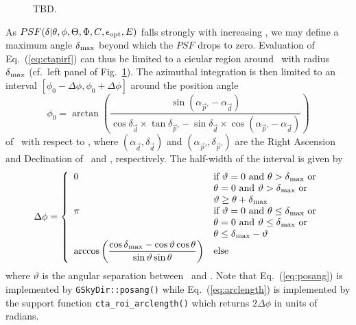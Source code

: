 \documentclass{article}[12pt,a4]
\begin{document}
\begin{figure}
\center
{}
\caption{TBD.
}
 \label{fig:ctapsfregion}
\end{figure}

As $PSF(\mbox{$\delta$} | \mbox{$\theta$}, \mbox{$\phi$}, \mbox{$\Theta$}, \mbox{$\Phi$}, \mbox{$C$}, \mbox{$\epsilon_{\rm opt}$}, E)$ falls strongly with increasing
\psfsep, we may define a maximum angle $\mbox{$\delta$}_{\rm max}$ beyond
which the $PSF$ drops to zero.
Evaluation of Eq.~(\ref{eq:ctapirf}) can thus be limited to a cicular region around
\phdir\ with radius $\mbox{$\delta$}_{\rm max}$ (cf.~left panel of Fig.~\ref{fig:ctapsfregion}).
The azimuthal integration is then limited to an interval 
$[\phi_0 - \Delta \phi, \phi_0 + \Delta \phi]$ around the position angle
\begin{equation}
\phi_0 = \arctan \left( 
\frac{\sin( \alpha_{\vec{p}'} - \alpha_{\vec{d}} )}
        {\cos \delta_{\vec{d}} \times \tan \delta_{\vec{p}'} - 
         \sin \delta_{\vec{d}} \times \cos( \alpha_{\vec{p}'} - \alpha_{\vec{d}} )}
\right)
\label{eq:posang}
\end{equation}
of \phdir\ with respect to \teldir, where
$(\alpha_{\vec{d}}, \delta_{\vec{d}})$ and
$(\alpha_{\vec{p}'}, \delta_{\vec{p}'})$ are the Right Ascension and Declination of
\teldir\ and \phdir, respectively.
The half-width of the interval is given by
\begin{equation}
\Delta \phi = \left \{
\begin{array}{l l}
\displaystyle
0 & \mbox{if $\vartheta = 0$ and $\mbox{$\theta$} > \mbox{$\delta$}_{\rm max}$ or} \\
& \mbox{$\mbox{$\theta$} = 0$ and $\vartheta > \mbox{$\delta$}_{\rm max}$ or} \\
& \mbox{$\vartheta \ge \mbox{$\theta$} + \mbox{$\delta$}_{\rm max}$} \\
\pi & \mbox{if $\vartheta = 0$ and $\mbox{$\theta$} \le \mbox{$\delta$}_{\rm max}$ or} \\
& \mbox{$\mbox{$\theta$} = 0$ and $\vartheta \le \mbox{$\delta$}_{\rm max}$ or} \\
& \mbox{$\mbox{$\theta$} \le \mbox{$\delta$}_{\rm max}-\vartheta$} \\
\displaystyle
\arccos \left ( 
\frac{\cos \mbox{$\delta$}_{\rm max} - \cos \vartheta \cos \mbox{$\theta$}}
        {\sin \vartheta \sin \mbox{$\theta$}} 
\right) & \mbox{else}
\end{array}
\right.
\label{eq:arclength}
\end{equation}
where
$\vartheta$ is the angular separation between \teldir\ and \phdir.
Note that 
Eq.~(\ref{eq:posang}) is implemented by {\tt GSkyDir::posang()}
while
Eq.~(\ref{eq:arclength}) is implemented by the support function
{\tt cta\_roi\_arclength()} which returns $2 \Delta \phi$ in units of radians.
\end{document}
